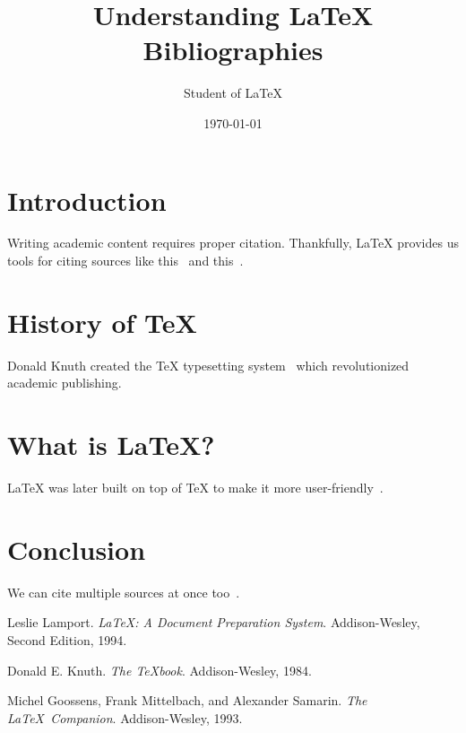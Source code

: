 \documentclass[12pt]{article}
\title{Understanding LaTeX Bibliographies}
\author{Student of LaTeX}
\date{\today}
\begin{document}
\maketitle

\section{Introduction}
Writing academic content requires proper citation. Thankfully, LaTeX provides us tools for citing sources like this~\cite{lamport94} and this~\cite{knuth84}.

\section{History of \TeX{}}
Donald Knuth created the \TeX{} typesetting system~\cite{knuth84} which revolutionized academic publishing.

\section{What is \LaTeX?}
\LaTeX{} was later built on top of \TeX{} to make it more user-friendly~\cite{lamport94}.

\section{Conclusion}
We can cite multiple sources at once too~\cite{lamport94,knuth84,goossens93}.

\begin{thebibliography}{9}

Leslie Lamport.  
\textit{\LaTeX: A Document Preparation System}.  
Addison-Wesley, Second Edition, 1994.

Donald E. Knuth.  
\textit{The \TeX{}book}.  
Addison-Wesley, 1984.

Michel Goossens, Frank Mittelbach, and Alexander Samarin.  
\textit{The \LaTeX\ Companion}.  
Addison-Wesley, 1993.

\end{thebibliography}
\end{document}
